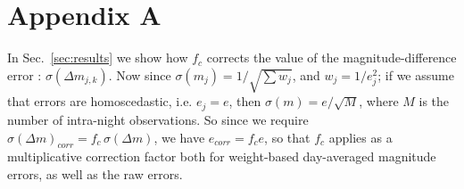 \documentclass[fleqn,usenatbib]{mnras}  %
\begin{document}
\section*{Appendix A}
In Sec.~\ref{sec:results} we show how $f_{c}$ corrects the value of the magnitude-difference error : $\sigma(\Delta m_{j,k})$. Now since $\sigma(m_{j}) = 1 / \sqrt{\sum{w_{j}}}$, and $w_{j} = 1 / e_{j}^{2}$; if we assume that errors are homoscedastic, i.e. $e_{j} = e$, then $\sigma(m) = e / \sqrt{M}$, where $M$ is the number of intra-night observations.  
So since we require $\sigma(\Delta m)_{corr} = f_{c} \, \sigma(\Delta m)$, we have $e_{corr} = f_{c} e$,  so that $f_{c}$ applies as a multiplicative correction factor both for weight-based day-averaged magnitude errors, as well as the raw errors. 







%



\bsp	%
\label{lastpage}
\end{document}
